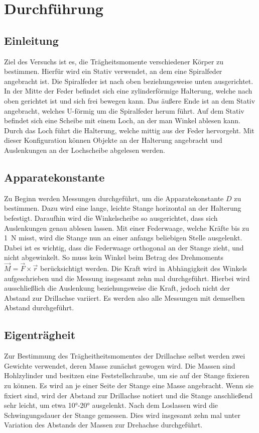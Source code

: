 \section{Durchführung}
\label{sec:Durchführung}

\subsection{Einleitung}
Ziel des Versuchs ist es, die Trägheitsmomente verschiedener Körper zu bestimmen. Hierfür wird ein Stativ verwendet, an dem eine Spiralfeder angebracht ist.
Die Spiralfeder ist nach oben beziehungsweise unten ausgerichtet. In der Mitte der Feder befindet sich eine zylinderförmige Halterung, welche nach oben gerichtet ist und sich frei bewegen kann.
Das äußere Ende ist an dem Stativ angebracht, welches U-förmig um die Spiralfeder herum führt. Auf dem Stativ befindet sich eine Scheibe mit einem Loch, an der man Winkel ablesen kann.
Durch das Loch führt die Halterung, welche mittig aus der Feder hervorgeht. Mit dieser Konfiguration können Objekte an der Halterung angebracht und Auslenkungen an 
der Lochscheibe abgelesen werden.

\subsection{Apparatekonstante}
Zu Beginn werden Messungen durchgeführt, um die Apparatekonstante $D$ zu bestimmen.
Dazu wird eine lange, leichte Stange horizontal an der Halterung befestigt. Daraufhin wird die Winkelscheibe so ausgerichtet, dass sich Auslenkungen genau ablesen lassen.
Mit einer Federwaage, welche Kräfte bis zu \SI{1}{\newton} misst, wird die Stange nun an einer anfangs beliebigen Stelle ausgelenkt. Dabei ist es wichtig, dass die Federwaage
orthogonal an der Stange zieht, und nicht abgewinkelt. So muss kein Winkel beim Betrag des Drehmoments $\vec{M}=\vec{F}\times\vec{r}$ berücksichtigt werden.  
Die Kraft wird in Abhängigkeit des Winkels aufgeschrieben und
die Messung insgesamt zehn mal durchgeführt.
Hierbei wird ausschließlich die Auslenkung beziehungsweise die Kraft, jedoch nicht der Abstand zur Drillachse variiert. Es werden also alle Messungen mit demselben Abstand durchgeführt.

\subsection{Eigenträgheit}
Zur Bestimmung des Trägheitheitsmomentes der Drillachse selbst werden zwei Gewichte verwendet, deren Masse zunächst gewogen wird.
Die Massen sind Hohlzylinder und besitzen eine Feststellschraube, um sie auf der Stange fixieren zu können.
Es wird an je einer Seite der Stange eine Masse angebracht. Wenn sie fixiert sind, wird der Abstand zur Drillachse notiert und die Stange anschließend sehr leicht,
um etwa \ang{10;;}-\ang{20;;} ausgelenkt. Nach dem Loslassen wird die Schwingungsdauer der Stange gemessen.
Dies wird insgesamt zehn mal unter Variation des Abstands der Massen zur Drehachse durchgeführt.

